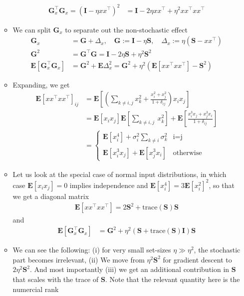 \documentclass{article}
\newcommand{\E}{{\mathbf E}}
\newcommand{\mI}{{\mathbf I}}
\newcommand{\mS}{{\mathbf S}}
\newcommand{\mG}{{\mathbf G}}
\begin{document}
\begin{enumerate}
\begin{itemize}
\begin{align}
\mG_x^\top \mG_x = (\mI - \eta x x^\top)^2  
& = \mI - 2 \eta x x^\top  + \eta^2 x x^\top x x^\top 
\end{align}
\item We can split $\mG_x$ to separate out the non-stochastic effect 
\begin{align}
\mG_x & = \mG + \Delta_x, \quad \mG :=  \mI - \eta \mS, \quad \Delta_x := \eta (\mS - x x^\top)\\
\mG^2 & = \mG^\top \mG  =  \mI - 2 \eta \mS  + \eta^2 \mS^2 \\
\E\left[ \mG_x^\top \mG_x \right] & = \mG^2 + \E\Delta_x^2 = \mG^2 +  \eta^2 (\E[xx^\top xx^\top] -\mS^2 ) 
\end{align}
\item Expanding, we get 
\begin{align}
\E\left[ x x^\top x x^\top\right]_{ij}
&  = \E\left[ \left( \sum_{k \neq i,j}x_k^2  + \frac{x_i^2 + x_j^2}{1+\delta_{ij}}\right) x_i x_j \right]  \\
& = \E \left[ x_i x_j \right] \E \left[\sum_{k \neq i,j} \ x_k^2 \right] + \E \left[ \frac{x_i^3 x_j + x_j^3 x_i}{1+\delta_{ij}} \right] \\
& = 
\begin{cases} 
	\E[x_i^4] + \sigma_i^2 \sum_{k \neq i} \sigma_k^2  & \text{i=j} \\
	\E \left[ x_i^3 x_j \right] + \E\left[ x_j^3 x_i \right] & \text{otherwise}
\end{cases}
\end{align}
\item Let us look at the special case of normal input distributions, in which case $\E[x_i x_j]=0$ implies independence and $\E[x_i^4] = 3 \E[x_i^2]^2$, so that we get  a diagonal matrix
\begin{align}
\E\left[ x x^\top x x^\top\right] = 2\mS^2  + \text{trace}(\mS) \mS
\end{align}
and 
\begin{align}
\E\left[ \mG_x^\top \mG_x \right] & = \mG^2 + \eta^2 ( \mS  + \text{trace}(\mS) \mI) \mS
\end{align}
%
\item We can see the following: (i) for very small set-sizes  $\eta \gg \eta^2$, the stochastic part becomes irrelevant, (ii) We move from $\eta^2 \mS^2$ for gradient descent to $2 \eta^2 \mS^2$. And most importantly (iii) we get an additional contribution in $\mS$ that scales with the trace of $\mS$. Note that the relevant quantity here is the numercial rank

\end{itemize}
\end{enumerate}
\end{document}
